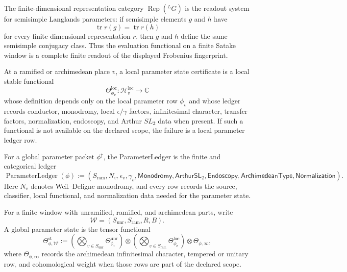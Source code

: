 \begin{definition}
\label{def:unified-reality-parameter-readout-completeness}
The finite-dimensional representation category $\operatorname{Rep}({}^LG)$
is the readout system for semisimple Langlands parameters: if semisimple
elements $g$ and $h$ have
$$
\operatorname{tr}r(g)=\operatorname{tr}r(h)
$$
for every finite-dimensional representation $r$, then $g$ and $h$ define
the same semisimple conjugacy class. Thus the evaluation functional on a
finite Satake window is a complete finite readout of the displayed
Frobenius fingerprint.
\end{definition}

\begin{definition}
\label{def:unified-reality-local-parameter-state-ledger}
At a ramified or archimedean place $v$, a local parameter state
certificate is a local stable functional
$$
\Theta_{\phi_v}^{\mathrm{loc}}:
\mathcal H_v^{\mathrm{loc}}\to\mathbb C
$$
whose definition depends only on the local parameter row $\phi_v$ and
whose ledger records conductor, monodromy, local
$\epsilon/\gamma$ factors, infinitesimal character, transfer factors,
normalization, endoscopy, and Arthur $SL_2$ data when present. If such a
functional is not available on the declared scope, the failure is a
local parameter ledger row.
\end{definition}

\begin{definition}
\label{def:unified-reality-global-parameter-ledger}
For a global parameter packet $\phi^{\uparrow}$, the ParameterLedger is
the finite and categorical ledger
$$
\operatorname{ParameterLedger}(\phi)
:=
(S_{\mathrm{ram}},N_v,\epsilon_v,\gamma_v,
\mathsf{Monodromy},\mathsf{ArthurSL}_2,\mathsf{Endoscopy},
\mathsf{ArchimedeanType},\mathsf{Normalization}).
$$
Here $N_v$ denotes Weil--Deligne monodromy, and every row records the
source, classifier, local functional, and normalization data needed for
the parameter state.
\end{definition}

\begin{definition}
\label{def:unified-reality-global-parameter-state}
For a finite window with unramified, ramified, and archimedean parts,
write
$$
\mathcal W=(S_{\mathrm{unr}},S_{\mathrm{ram}},R,B).
$$
A global parameter state is the tensor functional
$$
\Theta_{\phi,\mathcal W}^{\mathrm{st}}
:=
\left(\bigotimes_{v\in S_{\mathrm{unr}}}
\Theta_{\phi_v}^{\mathrm{unr}}\right)
\otimes
\left(\bigotimes_{v\in S_{\mathrm{ram}}}
\Theta_{\phi_v}^{\mathrm{loc}}\right)
\otimes
\Theta_{\phi,\infty},
$$
where $\Theta_{\phi,\infty}$ records the archimedean infinitesimal
character, tempered or unitary row, and cohomological weight when those
rows are part of the declared scope.
\end{definition}

